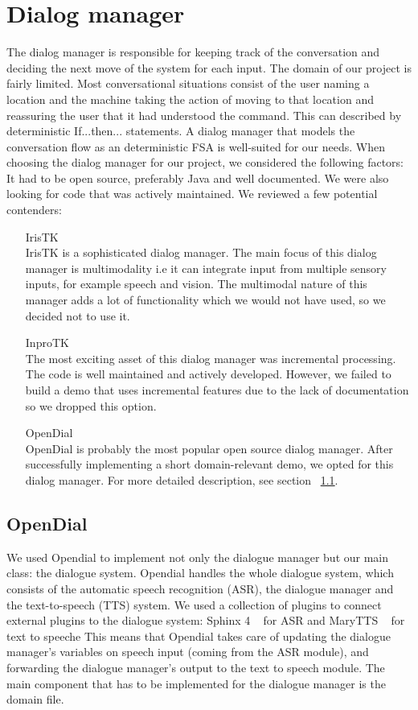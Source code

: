 \documentclass[a4paper, 12pt]{article}
\begin{document}
\section{Dialog manager}
\label{sec:Dialog_manager}
The dialog manager is responsible for keeping track of the conversation and deciding the next move of the system for each input. The domain of our project is fairly limited. Most conversational situations consist of the user naming a location and the machine taking the action of moving to that location and reassuring the user that it had understood the command. This can described by deterministic If...then... statements. A dialog manager that models the conversation flow as an deterministic FSA is well-suited for our needs.
When choosing the dialog manager for our project, we considered the following factors: It had to be open source, preferably Java and well documented.
We were also looking for code that was actively maintained.
We reviewed a few potential contenders:
\begin{itemize}
\item[IrisTK] \hfill \\
IrisTK is a sophisticated dialog manager. The main focus of this dialog manager is multimodality i.e it can integrate input from multiple sensory inputs, for example speech and vision. The multimodal nature of this manager adds a lot of functionality which we would not have used, so we decided not to use it.
\item[InproTK] \hfill \\
The most exciting asset of this dialog manager was incremental processing.
The code is well maintained and actively developed. 
However, we failed to build a demo that uses incremental features due to the lack of documentation so we dropped this option.
\item[OpenDial] \hfill \\
OpenDial is probably the most popular open source dialog manager.
After successfully implementing a short domain-relevant demo, we opted for this dialog manager.
For more detailed description, see section ~\ref{sec:opendial}.
\end{itemize}

\subsection{OpenDial}
\label{sec:opendial}
We used Opendial to implement not only the dialogue manager but our main class: the dialogue system. 
Opendial handles the whole dialogue system, which consists of the automatic speech recognition (ASR), the dialogue manager and the text-to-speech (TTS) system. 
We used a collection of plugins to connect external plugins to the dialogue system: Sphinx 4 ~\cite{Walker:2004:SFO:1698193} for ASR and MaryTTS ~\cite{marytts} for text to speeche 
This means that Opendial takes care of updating the dialogue manager's variables on speech input (coming from the ASR module), and forwarding the dialogue manager's output to the text to speech module. 
The main component that has to be implemented for the dialogue manager is the domain file. \\
\end{document}
